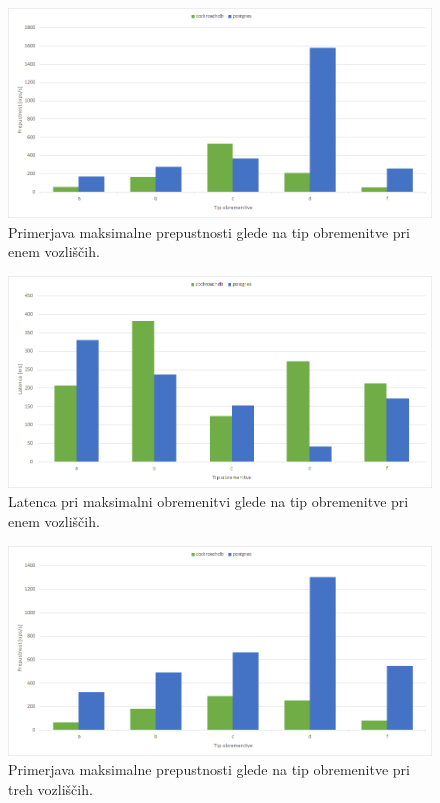 \documentclass[a4paper, 12pt]{book}
\begin{document}
\begin{figure}[H]
\begin{center}
\includegraphics[width=1\textwidth]{resources/maxThroughput-n1-v2.png}
\end{center}
\caption{Primerjava maksimalne prepustnosti glede na tip obremenitve pri enem vozliščih.}
\label{img_ycsb_results_max_throughput_n1}
\end{figure}

\begin{figure}[H]
\begin{center}
\includegraphics[width=1\textwidth]{resources/maxThroughput-latency-n1-v2.png}
\end{center}
\caption{Latenca pri maksimalni obremenitvi glede na tip obremenitve pri enem vozliščih.}
\label{img_ycsb_results_max_throughput_latency_n1}
\end{figure}

\newpage

\begin{figure}[H]
\begin{center}
\includegraphics[width=1\textwidth]{resources/maxThroughput-n3-v2.png}
\end{center}
\caption{Primerjava maksimalne prepustnosti glede na tip obremenitve pri treh vozliščih.}
\label{img_ycsb_results_max_throughput_n3}
\end{figure}
\end{document}
